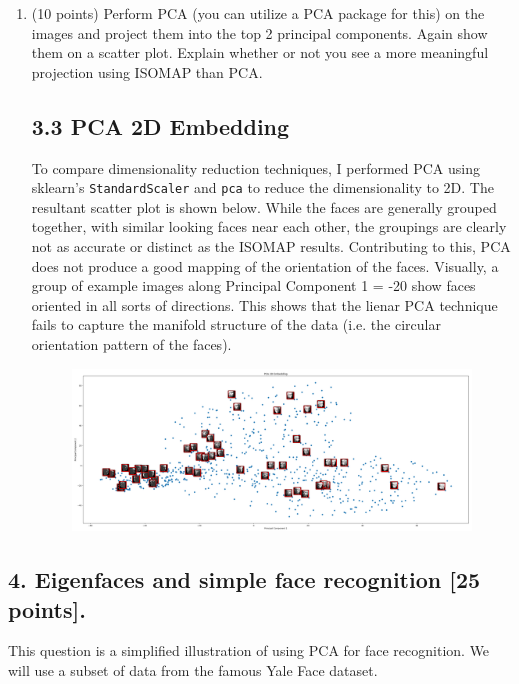 \documentclass[twoside,10pt]{article}
\begin{document}
\begin{enumerate}
\item (10 points) Perform PCA (you can utilize a PCA package for this) on the images and project them into the top 2 principal components. Again show them on a scatter plot. Explain whether or not you see a more meaningful projection using ISOMAP than PCA. 
\subsection*{3.3 PCA 2D Embedding}
To compare dimensionality reduction techniques, I performed PCA using sklearn's \lstinline{StandardScaler} and \lstinline{pca} to reduce the dimensionality to 2D. The resultant scatter plot is shown below. While the faces are generally grouped together, with similar looking faces near each other, the groupings are clearly not as accurate or distinct as the ISOMAP results. Contributing to this, PCA does not produce a good mapping of the orientation of the faces. Visually, a group of example images along Principal Component 1 = -20 show faces oriented in all sorts of directions. This shows that the lienar PCA technique fails to capture the manifold structure of the data (i.e. the circular orientation pattern of the faces).
 \begin{figure}[H]
                \centering
                \includegraphics[width=\textwidth]{images/3-3_pca_embedding.png}
                \label{fig:q3_pca}
            \end{figure}
\end{enumerate}




 \clearpage

\subsection*{4. Eigenfaces and simple face recognition [25 points].}

This question is a simplified illustration of using PCA for face recognition. We will use a subset of data from the famous Yale Face dataset. 
\end{document}
